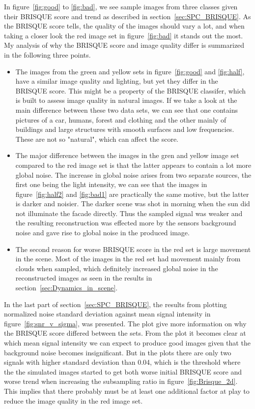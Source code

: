 In figure~\ref{fig:good} to \ref{fig:bad}, we see sample images from three classes given their BRISQUE score and trend as described in section~\ref{sec:SPC_BRISQUE}. As the BRISQUE score tells, the quality of the images should vary a lot, and when taking a closer look the red image set in figure~\ref{fig:bad} it stands out the most. My analysis of why the BRISQUE score and image quality differ is summarized in the following three points. 

\begin{itemize}
\item The images from the green and yellow sets in figure~\ref{fig:good} and \ref{fig:half}, have a similar image quality and lighting, but yet they differ in the BRISQUE score. This might be a property of the BRISQUE classifer, which is built to assess image quality in natural images. If we take a look at the main difference between these two data sets, we can see that one contains pictures of a car, humans, forest and clothing and the other mainly of buildings and large structures with smooth surfaces and low frequencies. These are not so "natural", which can affect the score.

\item The major difference between the images in the gren and yellow image set compared to the red image set is that the latter appears to contain a lot more global noise. The increase in global noise arises from two separate sources, the first one being the light intensity, we can see that the images in figure~\ref{fig:half2} and \ref{fig:bad1} are practically the same motive, but the latter is darker and noisier. The darker scene was shot in morning when the sun did not illuminate the facade directly. Thus the sampled signal was weaker and the resulting reconstruction was effected more by the sensors background noise and gave rise to global noise in the produced image. 

\item The second reason for worse BRISQUE score in the red set is large movement in the scene. Most of the images in the red set had movement mainly from clouds when sampled, which definitely increased global noise in the reconstructed images as seen in the results in section~\ref{sec:Dynamics_in_scene}.

\end{itemize}

In the last part of section~\ref{sec:SPC_BRISQUE}, the results from plotting normalized noise standard deviation against mean signal intensity in figure~\ref{fig:snr_v_sigma}, was presented. The plot give more information on why the BRISQUE score differed between the sets. From the plot it becomes clear at which mean signal intensity we can expect to produce good images given that the background noise becomes insignificant. But in the plots there are only two signals with higher standard deviation than 0.04, which is the threshold where the the simulated images started to get both worse initial BRISQUE score and worse trend when increasing the subsampling ratio in figure~\ref{fig:Brisque_2d}. This implies that there probably must be at least one additional factor at play to reduce the image quality in the red image set.\\[0.1in]


